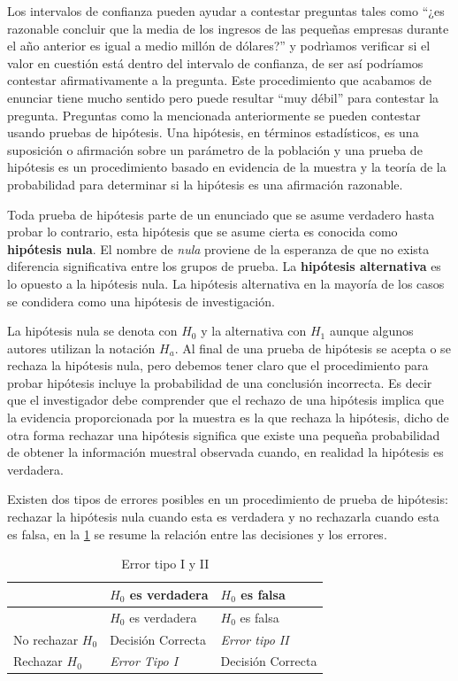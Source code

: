 \documentclass[]{book}
\begin{document}
Los intervalos de confianza pueden ayudar a contestar preguntas tales como ``¿es razonable concluir que la media de los ingresos de las pequeñas empresas durante el año anterior es igual a medio millón de dólares?'' y podrìamos verificar si el valor en cuestión está dentro del intervalo de confianza, de ser así podríamos contestar afirmativamente a la pregunta. Este procedimiento que acabamos de enunciar tiene mucho sentido pero puede resultar ``muy débil'' para contestar la pregunta. Preguntas como la mencionada anteriormente se pueden contestar usando pruebas de hipótesis. Una hipótesis, en términos estadísticos, es una suposición o afirmación sobre un parámetro de la población y una prueba de hipótesis es un procedimiento basado en evidencia de la muestra y la teoría de la probabilidad para determinar si la hipótesis es una afirmación razonable.

Toda prueba de hipótesis parte de un enunciado que se asume verdadero hasta probar lo contrario, esta hipótesis que se asume cierta es conocida como \textbf{hipótesis nula}. El nombre de \emph{nula} proviene de la esperanza de que no exista diferencia significativa entre los grupos de prueba. La \textbf{hipótesis alternativa} es lo opuesto a la hipótesis nula. La hipótesis alternativa en la mayoría de los casos se condidera como una hipótesis de investigación.

La hipótesis nula se denota con \(H_0\) y la alternativa con \(H_1\) aunque algunos autores utilizan la notación \(H_a\). Al final de una prueba de hipótesis se acepta o se rechaza la hipótesis nula, pero debemos tener claro que el procedimiento para probar hipótesis incluye la probabilidad de una conclusión incorrecta. Es decir que el investigador debe comprender que el rechazo de una hipótesis implica que la evidencia proporcionada por la muestra es la que rechaza la hipótesis, dicho de otra forma rechazar una hipótesis significa que existe una pequeña probabilidad de obtener la información muestral observada cuando, en realidad la hipótesis es verdadera.

Existen dos tipos de errores posibles en un procedimiento de prueba de hipótesis: rechazar la hipótesis nula cuando esta es verdadera y no rechazarla cuando esta es falsa, en la \ref{tab:err} se resume la relación entre las decisiones y los errores.

\begin{longtable}[]{@{}lll@{}}
\caption{\label{tab:err}Error tipo I y II}\tabularnewline
\toprule
& \(H_0\) es verdadera & \(H_0\) es falsa\tabularnewline
\midrule
\endfirsthead
\toprule
& \(H_0\) es verdadera & \(H_0\) es falsa\tabularnewline
\midrule
\endhead
No rechazar \(H_0\) & Decisión Correcta & \emph{Error tipo II}\tabularnewline
Rechazar \(H_0\) & \emph{Error Tipo I} & Decisión Correcta\tabularnewline
\bottomrule
\end{longtable}
\end{document}
